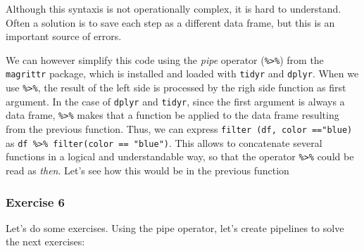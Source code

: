 \documentclass[]{article}
\newenvironment{Shaded}{\begin{snugshade}}{\end{snugshade}}
\newcommand{\KeywordTok}[1]{\textcolor[rgb]{0.13,0.29,0.53}{\textbf{#1}}}
\newcommand{\DataTypeTok}[1]{\textcolor[rgb]{0.13,0.29,0.53}{#1}}
\newcommand{\DecValTok}[1]{\textcolor[rgb]{0.00,0.00,0.81}{#1}}
\newcommand{\StringTok}[1]{\textcolor[rgb]{0.31,0.60,0.02}{#1}}
\newcommand{\CommentTok}[1]{\textcolor[rgb]{0.56,0.35,0.01}{\textit{#1}}}
\newcommand{\OperatorTok}[1]{\textcolor[rgb]{0.81,0.36,0.00}{\textbf{#1}}}
\newcommand{\NormalTok}[1]{#1}
\begin{document}
Although this syntaxis is not operationally complex, it is hard to
understand. Often a solution is to save each step as a different data
frame, but this is an important source of errors.

We can however simplify this code using the \emph{pipe} operator
(\texttt{\%\textgreater{}\%}) from the \texttt{magrittr} package, which
is installed and loaded with \texttt{tidyr} and \texttt{dplyr}. When we
use \texttt{\%\textgreater{}\%}, the result of the left side is
processed by the righ side function as first argument. In the case of
\texttt{dplyr} and \texttt{tidyr}, since the first argument is always a
data frame, \texttt{\%\textgreater{}\%} makes that a function be applied
to the data frame resulting from the previous function. Thus, we can
express \texttt{filter\ (df,\ color\ =="blue)} as
\texttt{df\ \%\textgreater{}\%\ filter(color\ ==\ "blue")}. This allows
to concatenate several functions in a logical and understandable way, so
that the operator \texttt{\%\textgreater{}\%} could be read as
\emph{then}. Let's see how this would be in the previous function

\begin{Shaded}
\end{Shaded}

\subsubsection{Exercise 6}\label{exercise-6}

Let's do some exercises. Using the pipe operator, let's create pipelines
to solve the next exercises:
\end{document}
